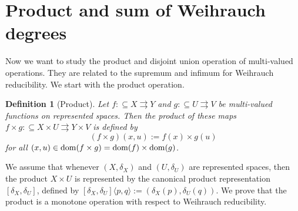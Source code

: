\documentclass[jsl,10pt]{noasl}
\def\In{\subseteq}
\def\mto{\rightrightarrows}
\def\dom{{\rm dom}}
\newtheorem{definition}[proposition]{Definition}
\begin{document}
\section{Product and sum of Weihrauch degrees}
\label{sec:product-sum}

Now we want to study the product and disjoint union operation of multi-valued
operations. They are related to the supremum and infimum for
Weihrauch reducibility. We start with the product operation.

\begin{definition}[Product]\rm
Let $f:\In X\mto Y$ and $g:\In U\mto V$ be multi-valued functions on represented spaces. 
Then the {\em product} of these maps $f\times g:\In X\times U\mto Y\times V$ is defined by 
\[(f\times g)(x,u):=f(x)\times g(u)\]
for all $(x,u)\in\dom(f\times g)=\dom(f)\times\dom(g)$.
\end{definition}

We assume that whenever $(X,\delta_X)$ and $(U,\delta_U)$ are represented spaces,
then the product $X\times U$ is represented by the canonical product
representation $[\delta_X,\delta_U]$, defined by $[\delta_X,\delta_U]\langle p,q\rangle:=(\delta_X(p),\delta_U(q))$.
We prove that the product is a monotone operation with
respect to Weihrauch reducibility.
\end{document}
